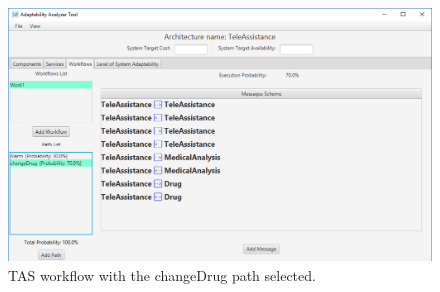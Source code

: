 \begin{figure}[h]
	\centerline
	{\includegraphics[scale=0.55]{img/TeleAssistancePath2.png}}
	\caption[TAS Workflow Path changeDrug]{TAS workflow with the changeDrug path selected.}
	\label{fig:tas-path2}
\end{figure}

\clearpage



